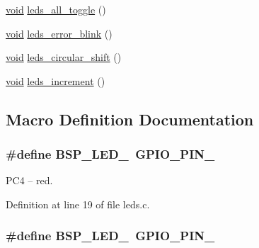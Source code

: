 \begin{DoxyCompactItemize}
\item 
\hyperlink{usb__devapi_8h_afabf60e7f57651d6d595a02c75f07cd0}{void} \hyperlink{group__leds_gaf65df497068c0dd5c1563298dc87d180}{leds\+\_\+all\+\_\+toggle} ()
\item 
\hyperlink{usb__devapi_8h_afabf60e7f57651d6d595a02c75f07cd0}{void} \hyperlink{group__leds_gab68d0db5256aabc4415415f1b33acab5}{leds\+\_\+error\+\_\+blink} ()
\item 
\hyperlink{usb__devapi_8h_afabf60e7f57651d6d595a02c75f07cd0}{void} \hyperlink{group__leds_gaa7592c1f5c7d250c0bafea1d29ff64ab}{leds\+\_\+circular\+\_\+shift} ()
\item 
\hyperlink{usb__devapi_8h_afabf60e7f57651d6d595a02c75f07cd0}{void} \hyperlink{group__leds_ga8dab59dd00dafd1644dfd57e59c8fc29}{leds\+\_\+increment} ()
\end{DoxyCompactItemize}


\subsection{Macro Definition Documentation}
\subsubsection[{\texorpdfstring{B\+S\+P\+\_\+\+L\+E\+D\+\_\+1}{BSP_LED_1}}]{\setlength{\rightskip}{0pt plus 5cm}\#define B\+S\+P\+\_\+\+L\+E\+D\+\_~{\bf G\+P\+I\+O\+\_\+\+P\+I\+N\+\_}}\hypertarget{_open_mote-_c_c2538_2leds_8c_ac735bbacfdc0829d717c2968d355e016}{}\label{_open_mote-_c_c2538_2leds_8c_ac735bbacfdc0829d717c2968d355e016}


P\+C4 -- red. 



Definition at line 19 of file leds.\+c.

\subsubsection[{\texorpdfstring{B\+S\+P\+\_\+\+L\+E\+D\+\_\+2}{BSP_LED_2}}]{\setlength{\rightskip}{0pt plus 5cm}\#define B\+S\+P\+\_\+\+L\+E\+D\+\_~{\bf G\+P\+I\+O\+\_\+\+P\+I\+N\+\_}}\hypertarget{_open_mote-_c_c2538_2leds_8c_a26beeb1f68fa093ec6bee8564c936305}{}\label{_open_mote-_c_c2538_2leds_8c_a26beeb1f68fa093ec6bee8564c936305}


